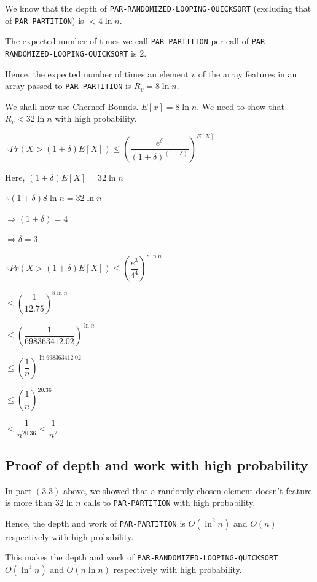 \documentclass{article}
\begin{document}
We know that the depth of \texttt{PAR-RANDOMIZED-LOOPING-QUICKSORT}
(excluding that of \texttt{PAR-PARTITION}) is $< 4\ln{n}$.

The expected number of times we call \texttt{PAR-PARTITION} per call
of \texttt{PAR-RANDOMIZED-LOOPING-QUICKSORT} is 2.

Hence, the expected number of times an element $v$ of the array
features in an array passed to \texttt{PAR-PARTITION} is $R_v =
8\ln{n}$.

We shall now use Chernoff Bounds. $E[x] = 8\ln{n}$. We need to show
that $R_v < 32\ln{n}$ with high probability.

$\therefore Pr(X > (1 + \delta)E[X]) \le 
\left(\dfrac{e^\delta}{(1+\delta)^{(1+\delta)}}\right)^{E[X]}$

Here, $(1 + \delta)E[X] = 32\ln{n}$

$\therefore (1+\delta)8\ln{n} = 32\ln{n}$

$\Rightarrow (1+\delta) = 4$

$\Rightarrow \delta = 3$

$\therefore Pr(X > (1 + \delta)E[X]) \le 
\left(\dfrac{e^3}{4^4}\right)^{8\ln{n}}$

$\le \left(\dfrac{1}{12.75}\right)^{8\ln{n}}$

$\le \left(\dfrac{1}{698363412.02}\right)^{\ln{n}}$

$\le \left(\dfrac{1}{n}\right)^{\ln{698363412.02}}$

$\le \left(\dfrac{1}{n}\right)^{20.36}$

$\le \dfrac{1}{n^{20.36}} \le \dfrac{1}{n^{2}}$

\subsection{Proof of depth and work with high probability}

In part $(3.3)$ above, we showed that a randomly chosen element
doesn't feature is more than $32\ln{n}$ calls to
\texttt{PAR-PARTITION} with high probability.

Hence, the depth and work of \texttt{PAR-PARTITION} is $O(\ln^2{n})$
and $O(n)$ respectively with high probability.

This makes the depth and work of
\texttt{PAR-RANDOMIZED-LOOPING-QUICKSORT} $O(\ln^3{n})$ and
$O(n\ln{n})$ respectively with high probability.
\end{document}
